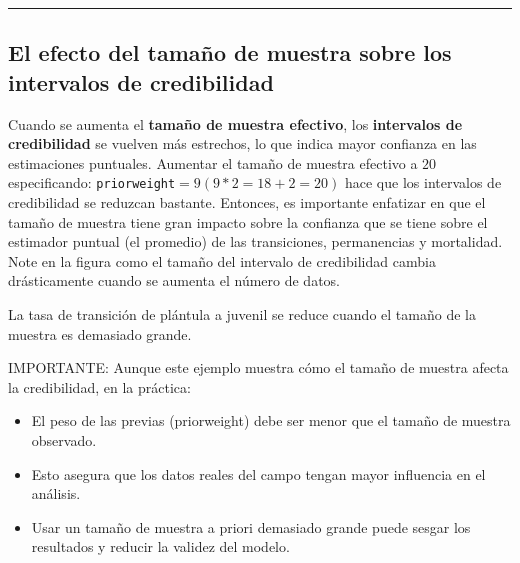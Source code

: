 \documentclass[
  12pt,
  letterpaper,
]{book}
\providecommand{\tightlist}{%
  \setlength{\itemsep}{0pt}\setlength{\parskip}{0pt}}\usepackage{longtable,booktabs,array}
\begin{document}
\begin{center}\rule{0.5\linewidth}{0.5pt}\end{center}

\subsection{El efecto del tamaño de muestra sobre los intervalos de
credibilidad}\label{el-efecto-del-tamauxf1o-de-muestra-sobre-los-intervalos-de-credibilidad}

Cuando se aumenta el \textbf{tamaño de muestra efectivo}, los
\textbf{intervalos de credibilidad} se vuelven más estrechos, lo que
indica mayor confianza en las estimaciones puntuales. Aumentar el tamaño
de muestra efectivo a \(20\) especificando:
\texttt{priorweight}\(= 9 (9*2 = 18 + 2 = 20)\) hace que los intervalos
de credibilidad se reduzcan bastante. Entonces, es importante enfatizar
en que el tamaño de muestra tiene gran impacto sobre la confianza que se
tiene sobre el estimador puntual (el promedio) de las transiciones,
permanencias y mortalidad. Note en la figura como el tamaño del
intervalo de credibilidad cambia drásticamente cuando se aumenta el
número de datos.

La tasa de transición de plántula a juvenil se reduce cuando el tamaño
de la muestra es demasiado grande.

IMPORTANTE: Aunque este ejemplo muestra cómo el tamaño de muestra afecta
la credibilidad, en la práctica:

\begin{itemize}
\tightlist
\item
  El peso de las previas (priorweight) debe ser menor que el tamaño de
  muestra observado.
\item
  Esto asegura que los datos reales del campo tengan mayor influencia en
  el análisis.
\item
  Usar un tamaño de muestra a priori demasiado grande puede sesgar los
  resultados y reducir la validez del modelo.
\end{itemize}
\end{document}
